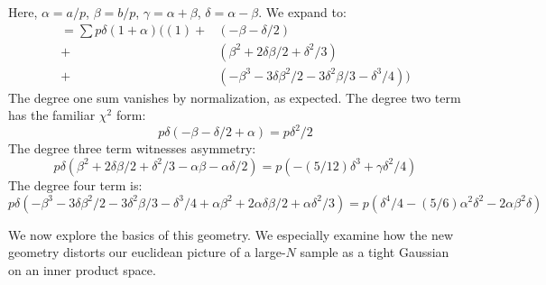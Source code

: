 \documentclass[12pt]{article}
\newcommand{\msec}[1]{\subsection*{\color{mblu}\textsf{#1}}}
\theoremstyle{definition}
\begin{document}
    Here, $\alpha=a/p$, $\beta=b/p$, $\gamma=\alpha+\beta$, $\delta = \alpha-\beta$.
    We expand to:
    \begin{align*}
        =  \sum p \delta (1+\alpha) (
              \left(1\right)  
            +&\left(-\beta-\delta/2\right)\\
            +&\left(\beta^2 +2\delta\beta/2 +\delta^2/3\right)\\
            +&\left(-\beta^3-3\delta\beta^2/2-3\delta^2\beta/3-\delta^3/4\right) )
    \end{align*}
    The degree one sum vanishes by normalization, as expected. 
    The degree two term has the familiar $\chi^2$ form:
    $$
        p\delta (-\beta-\delta/2 + \alpha) = p \delta^2/2
    $$
    The degree three term witnesses asymmetry:
    $$
        p\delta (\beta^2 +2\delta\beta/2 +\delta^2/3 -\alpha\beta-\alpha\delta/2)
        = p(-(5/12)\delta^3  + \gamma\delta^2/4)
    $$
    The degree four term is:
    $$
        p\delta (-\beta^3-3\delta\beta^2/2-3\delta^2\beta/3-\delta^3/4   
                 +\alpha\beta^2 +2\alpha\delta\beta/2 +\alpha\delta^2/3)
        = p(\delta^4/4 - (5/6)\alpha^2\delta^2 - 2\alpha\beta^2\delta) 
    $$


    We now explore the basics of this geometry. 
    We especially examine how the new geometry distorts our euclidean picture
    of a large-$N$ sample as a tight Gaussian on an inner product space.

    \msec{}
    \msec{}

\end{document}
